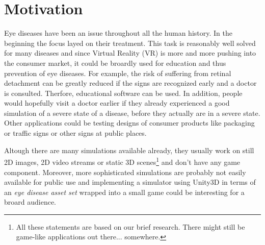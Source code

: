 \documentclass{acm_proc_article-sp}
\begin{document}
%

%
%
% 

\section{Motivation}
Eye diseases have been an issue throughout all the human history. In the
beginning the focus layed on their treatment. This task is reasonably well
solved for many diseases and since Virtual Reality (VR) is more and more
pushing into the consumer market, it could be broardly used for education and
thus prevention of eye diseases. For example, the risk of suffering from
retinal detachment can be greatly reduced if the signs are recognized early
and a doctor is consulted. Therfore, educational software can be used.
In addition, people would hopefully visit a doctor earlier if they already
experienced a good simulation of a severe state of a disease, before they
actually are in a severe state.
Other applications could be testing designs of consumer products like packaging
or traffic signs or other signs at public places.

Altough there are many simulations available already, they usually work on
still 2D images, 2D video streams or static 3D scenes\footnote{All these
statements are based on our brief research. There might still be game-like
applications out there... somewhere.} and don't have any game component.
Moreover, more sophisticated simulations are probably not easily available
for public use and implementing a simulator using Unity3D in terms of an
\emph{eye disease asset set} wrapped into a small game could be interesting
for a broard audience.

\end{document}

